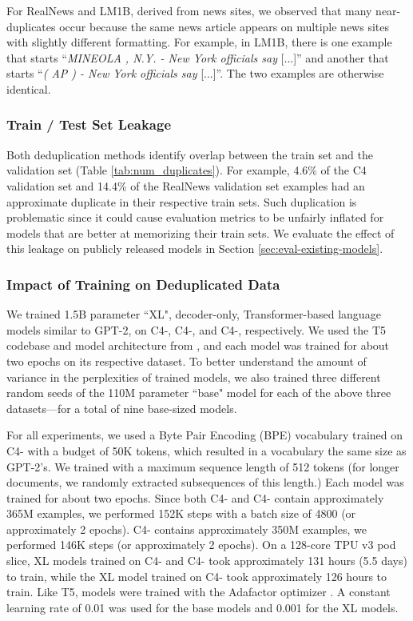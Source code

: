 For RealNews and LM1B, derived from news sites, we observed that many near-duplicates occur because the same news article appears on multiple news sites with slightly different formatting.
For example, in LM1B, there is one example that starts ``\textit{MINEOLA , N.Y. - New York officials say} [...]'' and another that starts ``\textit{( AP ) - New York officials say} [...]''.
The two examples are otherwise identical.

\subsubsection{Train / Test Set Leakage}
\label{sec:leakage}
Both deduplication methods identify overlap between the train set and the validation set (Table \ref{tab:num_duplicates}).
For example, 4.6\% of the C4 validation set and 14.4\% of the RealNews validation set examples had an approximate duplicate in their respective train sets.
Such duplication is problematic since it could cause evaluation metrics to be unfairly inflated for models that are better at memorizing their train sets.
We evaluate the effect of this leakage on publicly released models in Section \ref{sec:eval-existing-models}.

\subsubsection{Impact of Training on Deduplicated Data}
\label{sec:impact-trained-models}
We trained 1.5B parameter ``XL", decoder-only, Transformer-based language models similar to GPT-2, on C4-\Original, C4-\Approx, and C4-\Exact, respectively.
We used the T5 codebase and model architecture from \citet{raffel2019exploring}, and each model was trained for about two epochs on its respective dataset.
To better understand the amount of variance in the perplexities of trained models, we also trained three different random seeds of the 110M parameter ``base" model for each of the above three datasets---for a total of nine base-sized models.

For all experiments, we used a Byte Pair Encoding (BPE) vocabulary trained on C4-\Approx{} with a budget of 50K tokens, which resulted in a vocabulary the same size as GPT-2's.
We trained with a maximum sequence length of 512 tokens (for longer documents, we randomly extracted subsequences of this length.)
Each model was trained for about two epochs.
Since both C4-\Original{} and C4-\Exact{} contain approximately 365M examples, we performed 152K steps with a batch size of 4800 (or approximately 2 epochs). 
C4-\Approx{} contains approximately 350M examples, we performed 146K steps (or approximately 2 epochs).
On a 128-core TPU v3 pod slice, XL models trained on C4-\Original{} and C4-\Exact{} took approximately 131 hours (5.5 days) to train, while the XL model trained on C4-\Approx{} took approximately 126 hours to train.
Like T5, models were trained with the Adafactor optimizer \citep{shazeer2018adafactor}. A constant learning rate of 0.01 was used for the base models and 0.001 for the XL models.

